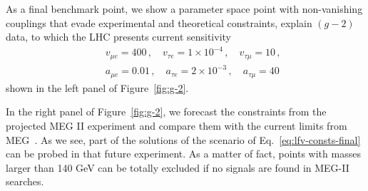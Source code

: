 \documentclass[prd,amsfonts,onecolumn,superscriptaddress,aps,nofootinbib,11pt]{revtex4-1}
\begin{document}
As a final benchmark point, we show a parameter space point with non-vanishing couplings that evade experimental and theoretical constraints, explain $(g-2)$ data, to which the LHC presents current sensitivity 
\begin{eqnarray}
\label{eq:lfv-consts-final}
&& v_{\mu e} = 400 \,, \quad v_{\tau e} = 1 \times 10^{-4} \,, \quad v_{\tau \mu} = 10\,, \nonumber \\
&& a_{\mu e} = 0.01 \,, \quad a_{\tau e} = 2 \times 10^{-3} \,, \quad a_{\tau \mu} = 40       
\end{eqnarray}
shown in the left panel of Figure~\ref{fig:g-2}.

In the right panel of Figure~\ref{fig:g-2}, we forecast the constraints from the projected MEG II experiment and compare them with the current limits from MEG~\cite{https://doi.org/10.48550/arxiv.1605.05081}. As we see, part of the solutions of the scenario of Eq.~\eqref{eq:lfv-consts-final} can be probed in that future experiment. As a matter of fact, points with masses larger than 140 GeV can be totally excluded if no signals are found in MEG-II searches.



\end{document}
